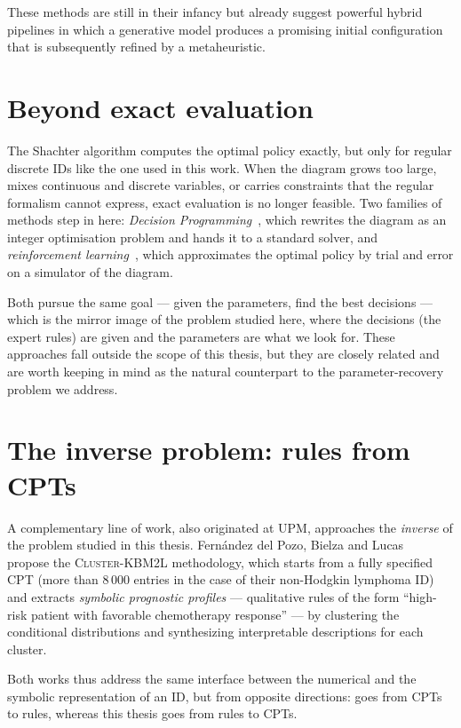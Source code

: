 These methods are still in their infancy but already suggest powerful
hybrid pipelines in which a generative model produces a promising initial
configuration that is subsequently refined by a metaheuristic.

\section{Beyond exact evaluation}

The Shachter algorithm computes the optimal policy exactly, but only
for regular discrete IDs like the one used in this work. When the
diagram grows too large, mixes continuous and discrete variables, or
carries constraints that the regular formalism cannot express, exact
evaluation is no longer feasible. Two families of methods step in
here: \emph{Decision Programming}~\cite{salo2022decisionprog}, which
rewrites the diagram as an integer optimisation problem and hands it
to a standard solver, and \emph{reinforcement
learning}~\cite{gomez2024rl}, which approximates the optimal policy by
trial and error on a simulator of the diagram. 

Both pursue the same
goal — given the parameters, find the best decisions — which is the
mirror image of the problem studied here, where the decisions (the
expert rules) are given and the parameters are what we look for.
These approaches fall outside the scope of this thesis, but they are
closely related and are worth keeping in mind as the natural
counterpart to the parameter-recovery problem we address.


\section{The inverse problem: rules from CPTs}

A complementary line of work, also originated at UPM, approaches the \emph{inverse} of the problem studied in this thesis. Fern{\'a}ndez del Pozo, Bielza and Lucas~\cite{fdezdelpozo2010cluster} propose the
\textsc{Cluster-KBM2L} methodology, which starts from a fully
specified CPT (more than 8\,000 entries in the case of their
non-Hodgkin lymphoma ID) and extracts \emph{symbolic prognostic
profiles} — qualitative rules of the form ``high-risk patient with
favorable chemotherapy response'' — by clustering the conditional
distributions and synthesizing interpretable descriptions for each
cluster. 

Both works thus address the same interface between the
numerical and the symbolic representation of an ID, but from
opposite directions: \cite{fdezdelpozo2010cluster} goes from CPTs
to rules, whereas this thesis goes from rules to CPTs.

